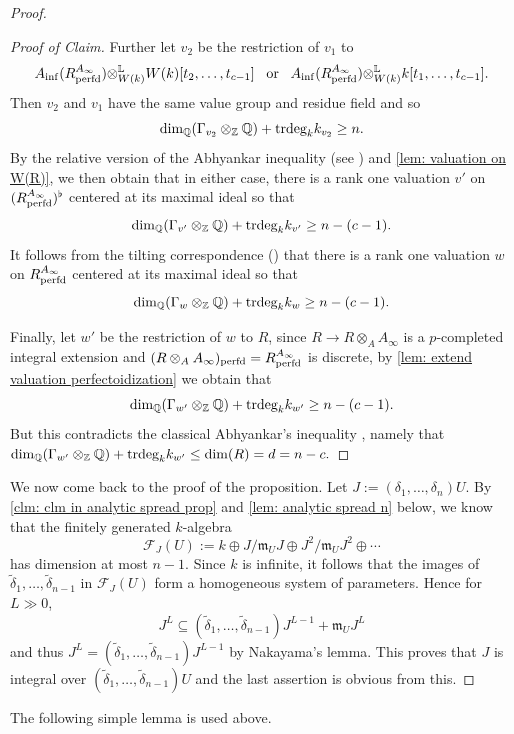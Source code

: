 \documentclass[12pt]{amsart}
\numberwithin{equation}{theorem}
\numberwithin{equation}{theorem}
\renewcommand{\m}{\mathfrak{m}}
\newcommand{\perfd}{\textnormal{perfd}}
\newcommand{\trdeg}{\textnormal{trdeg}}
\begin{document}
\begin{proof}
\begin{proof}[Proof of Claim]
Further let $v_2$ be the restriction of $v_1$ to
$$A_{\inf}(R^{A_\infty}_\perfd) {\otimes}^\myL_{W(k)} W(k)[t_2,\dots,t_{c-1}] \,\ \text{ or } \,\ A_{\inf}(R^{A_\infty}_\perfd) {\otimes}^\myL_{W(k)} k[t_1,\dots,t_{c-1}].$$
Then $v_2$ and $v_1$ have the same value group and residue field and so
$$\dim_\Q(\Gamma_{v_2}\otimes_\Z\Q) + \trdeg_kk_{v_2} \geq n.$$
By the relative version of the Abhyankar inequality (see \cite[VI.10.3,
Corollary 1]{Bourbaki1998}) and \autoref{lem: valuation on W(R)}, we then obtain that in either case, there is a rank one valuation $v'$ on $(R^{A_\infty}_\perfd)^\flat$ centered at its maximal ideal so that 
$$\dim_\Q(\Gamma_{v'}\otimes_\Z\Q) + \trdeg_kk_{v'} \geq n-(c-1).$$
It follows from the tilting correspondence (\cite[Lemma 3.4 (iii)]{ScholzePerfectoidSpaces2012}) that there is a rank one valuation $w$ on $R^{A_\infty}_\perfd$ centered at its maximal ideal so that 
$$\dim_\Q(\Gamma_{w}\otimes_\Z\Q) + \trdeg_kk_{w} \geq n-(c-1).$$

Finally, let $w'$ be the restriction of $w$ to $R$, since $R\to R\otimes_AA_\infty$ is a $p$-completed integral extension and $(R\otimes_AA_\infty)_\perfd=R^{A_\infty}_\perfd$ is discrete, by \autoref{lem: extend valuation perfectoidization} we obtain that 
$$\dim_\Q(\Gamma_{w'}\otimes_\Z\Q) + \trdeg_kk_{w'} \geq n-(c-1).$$
But this contradicts the classical Abhyankar's inequality \cite[Theorem 1]{AbhyankarValuations1956}, namely that $\dim_\Q(\Gamma_{w'}\otimes_\Z\Q) + \trdeg_kk_{w'} \leq \dim(R)=d =n-c.$
\end{proof}

We now come back to the proof of the proposition. Let $J:=(\delta_1,\dots,\delta_n)U$. By \autoref{clm: clm in analytic spread prop} and \autoref{lem: analytic spread n} below, we know that the finitely generated $k$-algebra 
$$\mathcal{F}_J(U):=k \oplus J/\m_UJ \oplus J^2/\m_UJ^2\oplus \cdots$$
has dimension at most $n-1$. Since $k$ is infinite, it follows that the images of $\widetilde{\delta}_1,\dots, \widetilde{\delta}_{n-1}$ in $\mathcal{F}_J(U)$ form a homogeneous system of parameters. Hence for $L\gg0$, 
$$J^L \subseteq (\widetilde{\delta}_1,\dots, \widetilde{\delta}_{n-1})J^{L-1} + \m_U J^L$$
and thus $J^L=(\widetilde{\delta}_1,\dots, \widetilde{\delta}_{n-1})J^{L-1}$ by Nakayama's lemma. This proves that $J$ is integral over $(\widetilde{\delta}_1,\dots, \widetilde{\delta}_{n-1})U$ and the last assertion is obvious from this.
\end{proof}

The following simple lemma is used above. 
\end{document}
